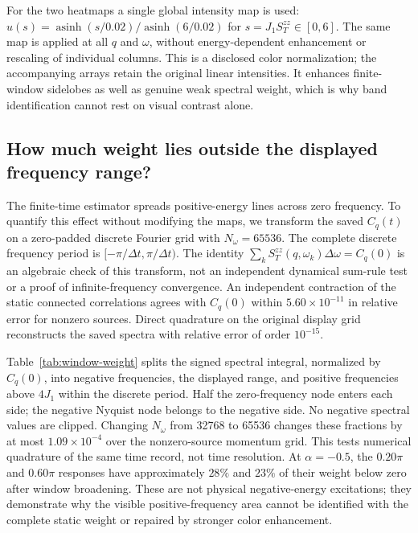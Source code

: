 For the two heatmaps a single global intensity map is used:
$u(s)=\operatorname{asinh}(s/0.02)/\operatorname{asinh}(6/0.02)$ for
$s=J_1S_T^{zz}\in[0,6]$.
The same map is applied at all $q$ and $\omega$, without energy-dependent
enhancement or rescaling of individual columns.
This is a disclosed color normalization; the accompanying arrays retain
the original linear intensities.
It enhances finite-window sidelobes as well as genuine weak spectral weight,
which is why band identification cannot rest on visual contrast alone.

\subsection{How much weight lies outside the displayed frequency range?}

The finite-time estimator spreads positive-energy lines across zero frequency.
To quantify this effect without modifying the maps, we transform the saved
$C_q(t)$ on a zero-padded discrete Fourier grid with $N_\omega=65536$.
The complete discrete frequency period is
$[-\pi/\Delta t,\pi/\Delta t)$.
The identity $\sum_k S_T^{zz}(q,\omega_k)\Delta\omega=C_q(0)$ is an
algebraic check of this transform, not an independent dynamical sum-rule test
or a proof of infinite-frequency convergence.
An independent contraction of the static connected correlations agrees with
$C_q(0)$ within $5.60\times10^{-11}$ in relative error for nonzero sources.
Direct quadrature on the original display grid reconstructs the saved
spectra with relative error of order $10^{-15}$.

Table~\ref{tab:window-weight} splits the signed spectral integral, normalized
by $C_q(0)$, into negative frequencies, the displayed range, and positive
frequencies above $4J_1$ within the discrete period.
Half the zero-frequency node enters each side; the negative Nyquist node
belongs to the negative side. No negative spectral values are clipped.
Changing $N_\omega$ from 32768 to 65536 changes these fractions by at most
$1.09\times10^{-4}$ over the nonzero-source momentum grid.
This tests numerical quadrature of the same time record, not time resolution.
At $\alpha=-0.5$, the $0.20\pi$ and $0.60\pi$ responses have approximately
$28\%$ and $23\%$ of their weight below zero after window broadening.
These are not physical negative-energy excitations; they demonstrate why
the visible positive-frequency area cannot be identified with the complete
static weight or repaired by stronger color enhancement.

